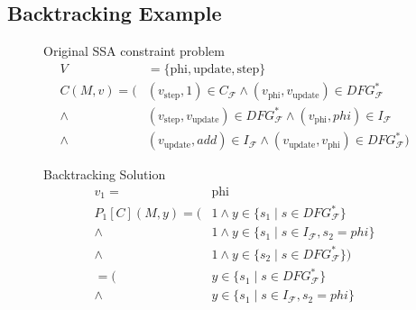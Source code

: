 \subsection{Backtracking Example}

\begin{figure}[p]
    \begin{blackwhitebox}{Original SSA constraint problem}
        \setlength{\abovedisplayskip}{0pt}
        \setlength{\belowdisplayskip}{0pt}
        \vspace{-0.5em}
        \begin{align*}
            V&{}=\{\text{phi}, \text{update}, \text{step}\}\\
            C(M,v)=         ({}&(v_\text{step},1)
                                 \in C_\mathcal{F}
                \mathrel\land   (v_\text{phi},v_\text{update})
                                 \in DFG_\mathcal{F}^*\\
                \mathrel\land{}&(v_\text{step},v_\text{update})
                                 \in DFG_\mathcal{F}^*
                \mathrel\land   (v_\text{phi}, phi)
                                 \in I_\mathcal{F}\\
                \mathrel\land{}&(v_\text{update}, add)
                                 \in I_\mathcal{F}
                \mathrel\land   (v_\text{update},v_\text{phi})
                                 \in DFG_\mathcal{F}^*)
        \end{align*}
    \end{blackwhitebox}
    \begin{blackwhitebox}{Backtracking Solution}
        \setlength{\abovedisplayskip}{0pt}
        \setlength{\belowdisplayskip}{0pt}
        \vspace{-0.5em}
        \begin{align*}
            v_1={}&\text{phi}\\
            P_1[C](M,y)=      (&1
                \mathrel\land   y\in\{s_1\mid s\in DFG_\mathcal{F}^*\}\\
                \mathrel\land{}&1
                \mathrel\land   y\in\{s_1\mid s\in I_\mathcal{F}, s_2=phi\}\\
                \mathrel\land{}&1
                \mathrel\land   y\in\{s_2\mid s\in DFG_\mathcal{F}^*\})\\[1em]
                       =      (&y\in\{s_1\mid s\in DFG_\mathcal{F}^*\}\\
                \mathrel\land{}&y\in\{s_1\mid s\in I_\mathcal{F}, s_2=phi\}\\

\end{align*}
\end{blackwhitebox}
\end{figure}
